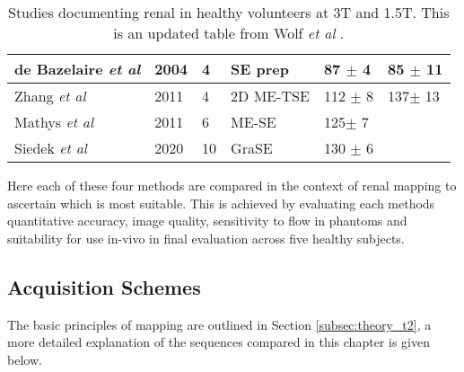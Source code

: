 \begin{table}[H]
\begin{adjustbox}{width=1.0\textwidth, center}
\begin{tabularx}{1.32\textwidth}{XXXXXX}
		\multicolumn{1}{l|}{de Bazelaire \textit{et al} \cite{de_bazelaire_mr_2004}} & \multicolumn{1}{l|}{2004} & \multicolumn{1}{l|}{4}           & \multicolumn{1}{l|}{SE \ttwo prep}   & \multicolumn{1}{l|}{87 $\pm$ 4}        & 85 $\pm$ 11        \\ \hline
		\multicolumn{1}{l|}{Zhang \textit{et al} \cite{zhang_reproducibility_2011}}  & \multicolumn{1}{l|}{2011} & \multicolumn{1}{l|}{4}           & \multicolumn{1}{l|}{2D ME-TSE}       & \multicolumn{1}{l|}{112 $\pm$ 8}       & 137$\pm$ 13        \\ \hline
		\multicolumn{1}{l|}{Mathys \textit{et al} \cite{mathys_t2_2011}}             & \multicolumn{1}{l|}{2011} & \multicolumn{1}{l|}{6}           & \multicolumn{1}{l|}{ME-SE}           & \multicolumn{1}{l|}{125$\pm$ 7}        &                    \\ \hline
		\multicolumn{1}{l|}{Siedek \textit{et al} \cite{siedek_magnetic_2020}}       & \multicolumn{1}{l|}{2020} & \multicolumn{1}{l|}{10}          & \multicolumn{1}{l|}{GraSE}           & \multicolumn{1}{l|}{130 $\pm$ 6}       &                   
	\end{tabularx}
	\end{adjustbox}
	\caption{Studies documenting renal \ttwo in healthy volunteers at 3T and 1.5T. This is an updated table from Wolf \textit{et al} \cite{wolf_magnetic_2018}.}
	\label{tab:t2_lit_values}
\end{table}

Here each of these four methods are compared in the context of renal \ttwo mapping to ascertain which is most suitable. This is achieved by evaluating each methods quantitative accuracy, image quality, sensitivity to flow in phantoms and suitability for use in-vivo in final evaluation across five healthy subjects.

\subsection{\ttwo Acquisition Schemes}
The basic principles of \ttwo mapping are outlined in Section \ref{subsec:theory_t2}, a more detailed explanation of the sequences compared in this chapter is given below. 

